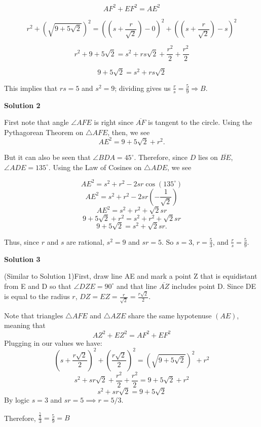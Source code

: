 \begin{enumerate}
 
 \[AF^2 + EF^2 = AE^2\]

 \[r^2  + \left(\sqrt{9 + 5\sqrt{2}}\right)^2  = \left(\left(s + \frac{r}{\sqrt{2}}\right) - 0\right)^2 + \left(\left(s + \frac{r}{\sqrt{2}}\right) - s\right)^2\]

 \[r^2  + 9 + 5\sqrt{2} = s^2 + rs\sqrt{2} + \frac{r^2}{2} + \frac{r^2}{2}\]

 \[9 + 5\sqrt{2} = s^2 + rs\sqrt{2}\]

 This implies that $rs = 5$ and $s^2 = 9$; dividing gives us $\frac{r}{s} = \frac{5}{9} \Rightarrow B$.

 



\textbf{Solution 2}

First note that angle $\angle AFE$ is right since $\overline{AF}$ is tangent to the circle. Using the Pythagorean Theorem on $\triangle AFE$, then, we see
 \[AE^2 = 9 + 5\sqrt{2} + r^2.\]

 But it can also be seen that $\angle BDA = 45^\circ$. Therefore, since $D$ lies on $\overline{BE}$, $\angle ADE = 135^\circ$. Using the Law of Cosines on $\triangle ADE$, we see

 
 \[AE^2 = s^2 + r^2 - 2sr\cos(135^\circ)\]
 \[AE^2 = s^2 + r^2 - 2sr\left(-\frac{1}{\sqrt{2}}\right)\]
 \[AE^2 = s^2 + r^2 + \sqrt{2}sr\]
 \[9 + 5\sqrt{2} + r^2 = s^2 + r^2 + \sqrt{2}sr\]
 \[9 + 5\sqrt{2} = s^2 + \sqrt{2}sr.\]

 Thus, since $r$ and $s$ are rational, $s^2 = 9$ and $sr = 5$. So $s = 3$, $r = \frac{5}{3}$, and $\frac{r}{s} = \frac{5}{9}$.

 



\textbf{Solution 3}

(Similar to Solution 1)First, draw line AE and mark a point Z that is equidistant from E and D so that $\angle{DZE} = 90^\circ$ and that line $\overline{AZ}$ includes point D. Since DE is equal to the radius $r$, $DZ=EZ=\frac{r}{\sqrt2}=\frac{r\sqrt2}{2}.$

 Note that triangles $\triangle AFE$ and $\triangle AZE$ share the same hypotenuse $(AE)$, meaning that
 \[AZ^2+EZ^2=AF^2+EF^2\]Plugging in our values we have:
 \[\left(s+\frac{r\sqrt{2}}{2}\right)^2+\left(\frac{r\sqrt{2}}{2}\right)^2=\left(\sqrt{9+5\sqrt{2}}\right)^2+r^2\]
 \[s^2+sr\sqrt{2}+\frac{r^2}{2}+\frac{r^2}{2}=9+5\sqrt{2}+r^2\]
 \[s^2+sr\sqrt{2}=9+5\sqrt{2}\]By logic $s=3$ and $sr=5 \implies r=5/3.$

 Therefore, $\frac{\frac{5}{3}}{3}=\frac{5}{9}=\boxed{B}$





\end{enumerate}
